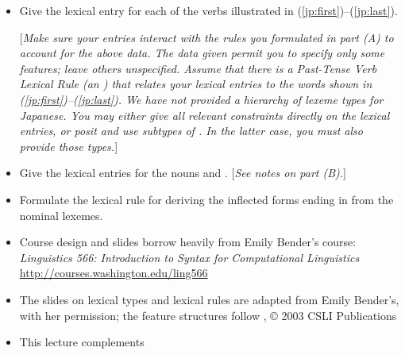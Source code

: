 \documentclass[a4paper,landscape,headrule,footrule]{foils}
\begin{document}
\begin{itemize}\addtolength{\itemsep}{1ex}
\item[B.] Give the lexical entry for each of the verbs
illustrated in (\ref{jp:first})--(\ref{jp:last}). 

[{\sl Make sure your entries interact with the rules you
formulated in part (A) to account for the above data.  The data given
permit you to specify only some features; leave others unspecified.
Assume that there is a Past-Tense Verb Lexical Rule (an )
that relates your lexical entries to the words shown in (\ref{jp:first})--(\ref{jp:last}).  We
have not provided a hierarchy of lexeme types for Japanese.  You may
either give all relevant constraints directly on the lexical entries,
or posit and use subtypes of .  In the latter case, you
must also provide those types.}]

\item[C.] Give the lexical entries for the nouns  and
. [{\sl See notes on part (B).}]

\item[D.] Formulate the lexical rule for deriving the inflected
forms ending in  from the nominal lexemes.
\end{itemize}



\begin{itemize}
\item Course design and slides borrow heavily from Emily Bender's course:
\textit{Linguistics 566: Introduction to Syntax for Computational Linguistics}
\\ \url{http://courses.washington.edu/ling566}
\item The slides on lexical types and lexical rules are adapted from
  Emily Bender's, with her permission; the feature structures follow
  \citet{sag:wasow:bender:2003}, \copyright{} 2003 CSLI Publications
\item This lecture complements \citet[Chapter 8]{sag:wasow:bender:2003}
\end{itemize}


%



\end{document}
